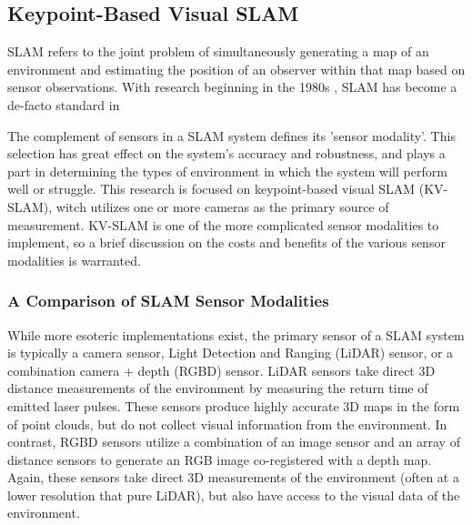 \subsection{Keypoint-Based Visual SLAM}

SLAM refers to the joint problem of simultaneously generating a map of an environment and estimating the position of an observer within that map based on sensor observations. With research beginning in the 1980s \cite{smithEstimatingUncertainSpatial1988}, SLAM has become a de-facto standard in 

The complement of sensors in a SLAM system defines its 'sensor modality'. This selection has great effect on the system's accuracy and robustness, and plays a part in determining the types of environment in which the system will perform well or struggle. This research is focused on keypoint-based visual SLAM (KV-SLAM), witch utilizes one or more cameras as the primary source of measurement. KV-SLAM is one of the more complicated sensor modalities to implement, so a brief discussion on the costs and benefits of the various sensor modalities is warranted.

\subsubsection{A Comparison of SLAM Sensor Modalities}

While more esoteric implementations exist, the primary sensor of a SLAM system is typically a camera sensor, Light Detection and Ranging (LiDAR) sensor, or a combination camera + depth (RGBD) sensor. LiDAR sensors take direct 3D distance measurements of the environment by measuring the return time of emitted laser pulses. These sensors produce highly accurate 3D maps in the form of point clouds, but do not collect visual information from the environment. In contrast, RGBD sensors utilize a combination of an image sensor and an array of distance sensors to generate an RGB image co-registered with a depth map. Again, these sensors take direct 3D measurements of the environment (often at a lower resolution that pure LiDAR), but also have access to the visual data of the environment.

